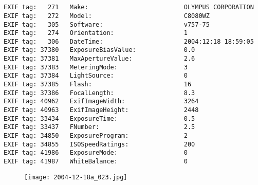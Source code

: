 \section{\protect{}}
\noindent 
\noindent
\begin{lstlisting}
EXIF tag:   271   Make:                          OLYMPUS CORPORATION
EXIF tag:   272   Model:                         C8080WZ
EXIF tag:   305   Software:                      v757-75
EXIF tag:   274   Orientation:                   1
EXIF tag:   306   DateTime:                      2004:12:18 18:59:05
EXIF tag: 37380   ExposureBiasValue:             0.0
EXIF tag: 37381   MaxApertureValue:              2.6
EXIF tag: 37383   MeteringMode:                  3
EXIF tag: 37384   LightSource:                   0
EXIF tag: 37385   Flash:                         16
EXIF tag: 37386   FocalLength:                   8.3
EXIF tag: 40962   ExifImageWidth:                3264
EXIF tag: 40963   ExifImageHeight:               2448
EXIF tag: 33434   ExposureTime:                  0.5
EXIF tag: 33437   FNumber:                       2.5
EXIF tag: 34850   ExposureProgram:               2
EXIF tag: 34855   ISOSpeedRatings:               200
EXIF tag: 41986   ExposureMode:                  0
EXIF tag: 41987   WhiteBalance:                  0

\end{lstlisting}
\clearpage
\begin{figure}
\raggedleft
\texttt{[image: 2004-12-18a\_023.jpg]}
\end{figure}


\clearpage

